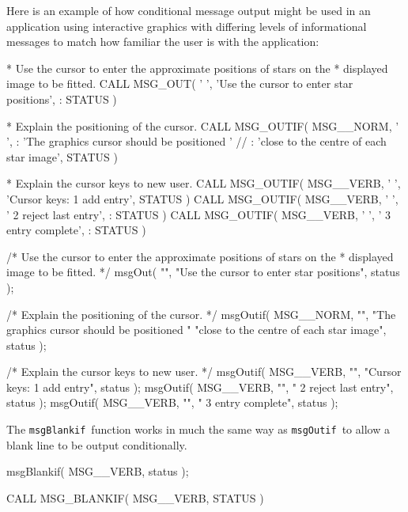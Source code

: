 \documentclass[twoside,11pt]{starlink}
\providecommand{\func}[1]{\texttt{#1}}
\providecommand{\msgblankif}{\func{msgBlankif}}
\providecommand{\msgoutif}{\func{msgOutif}}
\begin{document}
Here is an example of how conditional message output might be used
in an application using interactive graphics with differing levels of
informational messages to match how familiar the user is with the application:
\begin {small}
\begin{terminalv}
*  Use the cursor to enter the approximate positions of stars on the
*  displayed image to be fitted.
      CALL MSG_OUT( ' ', 'Use the cursor to enter star positions',
     :             STATUS )

*  Explain the positioning of the cursor.
      CALL MSG_OUTIF( MSG__NORM, ' ',
     :               'The graphics cursor should be positioned ' //
     :               'close to the centre of each star image', STATUS )

*  Explain the cursor keys to new user.
      CALL MSG_OUTIF( MSG__VERB, ' ', 'Cursor keys: 1 add entry', STATUS )
      CALL MSG_OUTIF( MSG__VERB, ' ', '             2 reject last entry',
     :               STATUS )
      CALL MSG_OUTIF( MSG__VERB, ' ', '             3 entry complete',
     :               STATUS )
\end{terminalv}
\end {small}
\begin {small}
\begin{terminalv}
/*  Use the cursor to enter the approximate positions of stars on the
 *  displayed image to be fitted. */
      msgOut( "", "Use the cursor to enter star positions", status );

/*  Explain the positioning of the cursor. */
      msgOutif( MSG__NORM, "",
                "The graphics cursor should be positioned "
                "close to the centre of each star image", status );

/*  Explain the cursor keys to new user. */
      msgOutif( MSG__VERB, "", "Cursor keys: 1 add entry", status );
      msgOutif( MSG__VERB, "", "             2 reject last entry", status );
      msgOutif( MSG__VERB, "", "             3 entry complete", status );
\end{terminalv}
\end {small}

The \msgblankif\ function works in much the same way as \msgoutif\ to
allow a blank line to be output conditionally.

\begin{small}
\begin{terminalv}
      msgBlankif( MSG__VERB, status );

      CALL MSG_BLANKIF( MSG__VERB, STATUS )
\end{terminalv}
\end{small}
\end{document}
